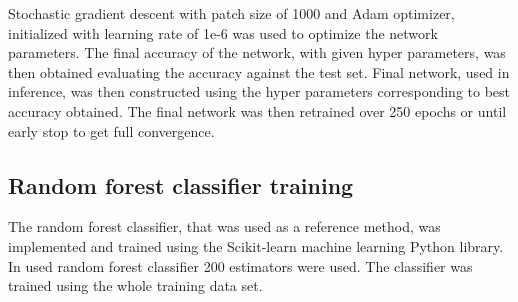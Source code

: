 \documentclass[aps,prb,10pt,twocolumn,groupedaddress]{revtex4-1}
\begin{document}
Stochastic gradient descent with patch size of 1000 and Adam optimizer\cite{adam}, initialized with learning rate of 1e-6 was used to optimize the network parameters. The final accuracy of the network, with given hyper parameters, was then obtained evaluating the accuracy against the test set. Final network, used in inference, was then constructed using the hyper parameters corresponding to best accuracy obtained. The final network was then retrained over 250 epochs or until early stop to get full convergence.

\subsection{Random forest classifier training}
\label{sec:computational_methods_training_random_forest}
The random forest classifier, that was used as a reference method, was implemented and trained using the Scikit-learn machine learning Python library. In used random forest classifier 200 estimators were used. The classifier was trained using the whole training data set.
\end{document}
